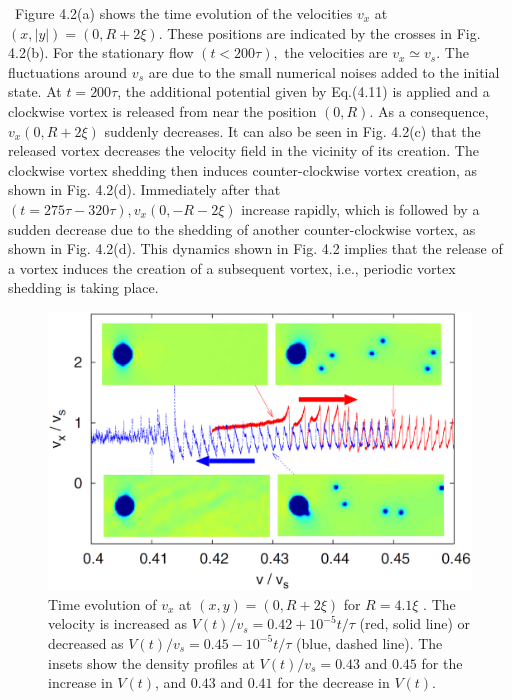 \documentclass[12pt,a4paper]{report} %
\begin{document}
\ Figure 4.2(a) shows the time evolution of the velocities
$v_x$ at $ \left( x, |y| \right) = \left( 0, R + 2 \xi \right)$. 
These positions are indicated by the crosses in Fig. 4.2(b).
For the stationary flow $(t < 200 \tau),$ the velocities are 
$v_x \simeq v_s$. The fluctuations around $v_s$ are due to
the small numerical noises added
to the initial state. At $t=200 \tau$, the additional potential
given by Eq.(4.11) is applied and a clockwise vortex is 
released from near the position $\left( 0, R \right)$. As a consequence,
$v_x \left( 0, R+ 2 \xi \right)$ suddenly decreases. It can also be seen in
Fig. 4.2(c) that the released vortex decreases the velocity
field in the vicinity of its creation. The clockwise vortex
shedding then induces counter-clockwise vortex creation,
as shown in Fig. 4.2(d). Immediately after that $(t=275 \tau -320 \tau),
v_x(0,-R-2\xi)$ increase rapidly, which is followed
by a sudden decrease due to the shedding of another
counter-clockwise vortex, as shown in Fig. 4.2(d). This
dynamics shown in Fig. 4.2 implies that the release of a
vortex induces the creation of a subsequent vortex, i.e.,
periodic vortex shedding is taking place.
\\
\begin{figure}[htbp]
\begin{center}
\includegraphics[scale=0.30, keepaspectratio]{4-3.eps}
\caption{
Time evolution of $v_x$ at $(x,y) = (0,R +
2 \xi)$ for $R = 4.1 \xi$ . The velocity is increased as $V(t)/v_s = 0.42 +
10^{-5}t/ \tau$ (red, solid line) or decreased as $V(t)/v_s = 0.45-10^{-5}t/\tau$
(blue, dashed line). The insets show the density profiles at $V(t)/v_s =
0.43$ and $0.45$ for the increase in $V(t)$, and $0.43$ and $0.41$ for the
decrease in $V(t)$.
}
\label{FIG:4-3}
\end{center}
\end{figure}
\end{document}
